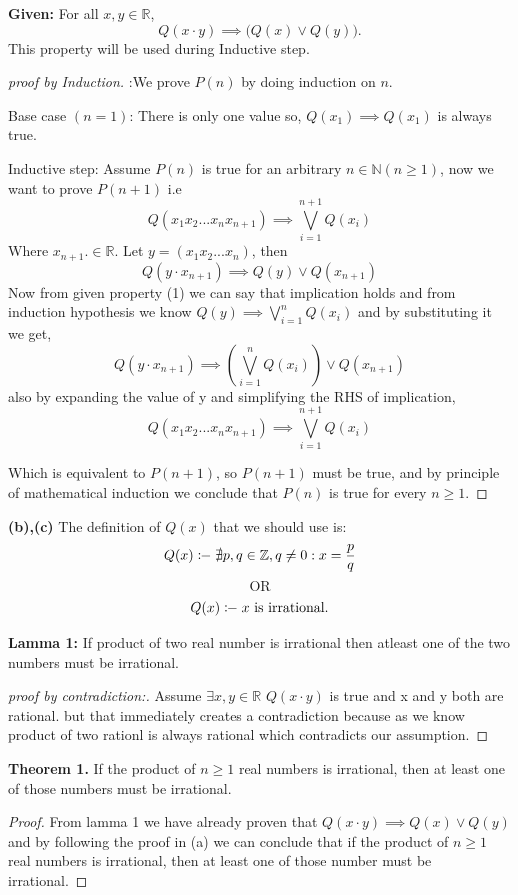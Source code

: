 \documentclass{article}
\begin{document}
\textbf{Given:} For all $x,y \in \mathbb{R}$,
\[
Q(x \cdot y) \implies \bigl(Q(x) \lor Q(y)\bigr). \tag{1}
\]  
This property will be used during Inductive step.

\begin{proof}[proof by Induction]:We prove $P(n)$ by doing induction on $n$.

    Base case $(n = 1)$: There is only one value so, $Q(x_1) \implies Q(x_1)$ is always true. 
    
    Inductive step: Assume $P(n)$ is true for an arbitrary $n \in \mathbb{N} (n \geq 1)$, now we want to prove $P(n + 1)$ i.e
    \[Q(x_1x_2...x_nx_{n+1}) \implies \bigvee_{i=1}^{n+1}Q(x_i)\]   
    Where $x_{n+1}. \in \mathbb{R}$. Let $y = (x_1 x_2...x_n)$, then 
    \[Q(y \cdot x_{n+1}) \implies Q(y) \lor Q(x_{n+1})\]
    Now from given property (1) we can say that implication holds and from induction hypothesis we know $Q(y) \implies \bigvee_{i=1}^{n}Q(x_i) $
    and by substituting it we get, 
    \[Q(y \cdot x_{n+1}) \implies \left( \bigvee_{i=1}^{n}Q(x_i) \right) \lor Q(x_{n+1})\]
    also by expanding the value of y and simplifying the RHS of implication,
    \[Q(x_1x_2...x_nx_{n+1}) \implies \bigvee_{i=1}^{n+1}Q(x_i)\]   

    Which is equivalent to $P(n+1)$, so $P(n+1)$ must be true, and by principle of mathematical induction we conclude that $P(n)$ is true for every $n \geq 1$.
\end{proof}

\pagebreak

\textbf{(b),(c)}
The definition of $Q(x)$ that we should use is:
\[Q(x) \colondash \nexists p,q \in \mathbb{Z},q \neq 0 : x = \frac{p}{q} \]
\[\text{OR}\]
\[Q(x) \colondash x \text{ is irrational.}\]

\textbf{Lamma 1:} If product of two real number is irrational then atleast one of the two numbers must be irrational.

\begin{proof}[proof by contradiction:] 

Assume $\exists{x,y} \in \mathbb{R}$  $Q(x \cdot y)$ is true and x and y both are rational. but that immediately 
creates a contradiction because as we know product of two rationl is always rational which contradicts our 
assumption.

\end{proof}


\textbf{Theorem 1.} If the product of $n \geq 1$ real numbers is irrational, then at least one of those numbers must be irrational.
\begin{proof}
From lamma 1 we have already proven that $Q(x \cdot y) \implies Q(x) \lor Q(y)$ and by following the proof in 
(a) we can conclude that if the product of $n \geq 1$ real numbers is irrational, then at least one of those 
number must be irrational. 
\end{proof}
\end{document}
